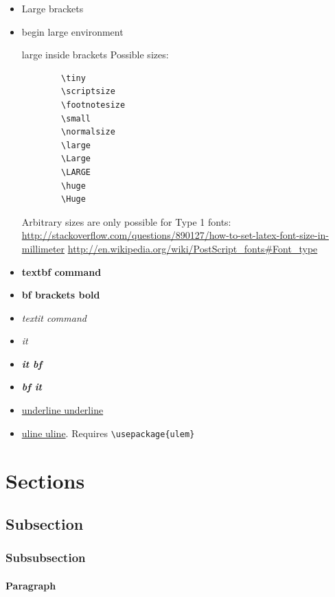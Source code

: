 \documentclass[12pt]{article}
\begin{document}
  \begin{itemize}
    \item {\Large Large brackets}
    \item
      \begin{Large}begin large environment\end{Large}
      {\Large large inside brackets}
      Possible sizes:
      \begin{lstlisting}
        \tiny
        \scriptsize
        \footnotesize
        \small
        \normalsize
        \large
        \Large
        \LARGE
        \huge
        \Huge
      \end{lstlisting}

      Arbitrary sizes are only possible for Type 1 fonts: \url{http://stackoverflow.com/questions/890127/how-to-set-latex-font-size-in-millimeter}
      \url{http://en.wikipedia.org/wiki/PostScript_fonts#Font_type}
    \item \textbf{textbf command}
    \item {\bf bf brackets bold}
    \item \textit{textit command}
    \item {\it it}
    \item {\it \bf it bf}
    \item {\bf \it bf it}
    \item \underline{underline underline}
    \item \uline{uline uline}. Requires \lstinline|\usepackage{ulem}|
  \end{itemize}

\section{Sections}\label{sections}

  \subsection{Subsection}\label{subsection}

    \subsubsection{Subsubsection}\label{subsubsection}

      \paragraph{Paragraph}\label{paragraph}
\end{document}
